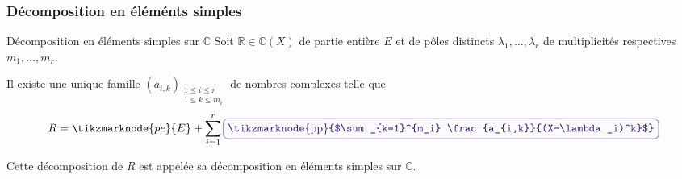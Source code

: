     \subsubsection{Décomposition en éléménts simples}

    \begin{theo}{Décomposition en éléments simples sur $\mathbb{C}$}{}
        Soit $\mathbb{R} \in \mathbb{C}(X)$ de partie entière $E$ et de pôles distincts $\lambda_1, \ldots, \lambda_r$ de multiplicités respectives $m_1,\ldots,m_r$.

        Il existe une unique famille $(a_{i,k})_{\substack{1 \leq i \leq r \\ 1 \leq k \leq m_i}}$ de nombres complexes telle que 
        \[ R = \tikzmarknode{pe}{E} + \sum_{i=1}^{r} \lilbox{mypurple}{\tikzmarknode{pp}{$\sum_{k=1}^{m_i} \frac{a_{i,k}}{(X-\lambda_i)^k}$}} \]
        \begin{center}\footnotesize 
            \hspace*{5cm}
        \end{center}
        Cette décomposition de $R$ est appelée sa décomposition en éléments simples sur $\mathbb{C}$.
    \end{theo}

